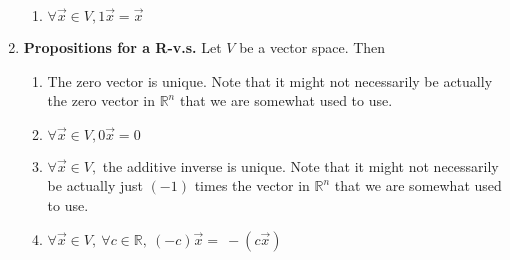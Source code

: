 \documentclass[oneside, 12pt]{book}
\newcommand{\settag}[1]{\renewcommand{\theenumi}{#1}}
\begin{document}
\begin{enumerate}
\begin{enumerate}
        \item $\forall \vec{x} \in V, 1\vec{x} = \vec{x}$
    \end{enumerate}
    \settag{1.1.6}
    \item \textbf{Propositions for a R-v.s.} Let $V$ be a vector space. Then 
    \begin{enumerate}
        \item The zero vector is unique. Note that it might not necessarily be actually the zero vector in $\mathbb{R}^n$ that we are somewhat used to use.
        \item $\forall \vec{x} \in V, 0\vec{x}=0$
        \item $\forall \vec{x} \in V, $ the additive inverse is unique. Note that it might not necessarily be actually just $(-1)$ times the vector in $\mathbb{R}^n$ that we are somewhat used to use.
        \item $\forall \vec{x} \in V,~\forall c\in \mathbb{R}, ~(-c)\vec{x}=~-(c\vec{x})$
    \end{enumerate}
\end{enumerate}
\end{document}

